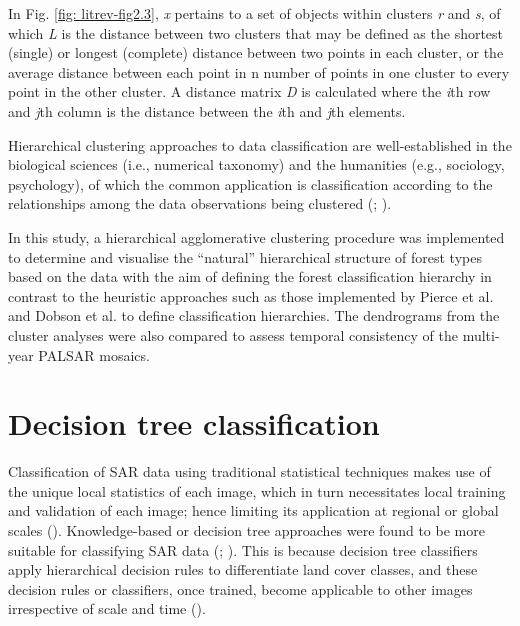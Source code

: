 In Fig. \ref{fig: litrev-fig2.3}, \textit{x} pertains to a set of objects within clusters \textit{r} and \textit{s}, of which \textit{L} is the distance between two clusters that may be defined as the shortest (single) or longest (complete) distance between two points in each cluster, or the average distance between each point in n number of points in one cluster to every point in the other cluster. A distance matrix \textit{D} is calculated where the \textit{i}th row and \textit{j}th column is the distance between the \textit{i}th and \textit{j}th elements.

Hierarchical clustering approaches to data classification are well-established in the biological sciences (i.e., numerical taxonomy) and the humanities (e.g., sociology, psychology), of which the common application is classification according to the relationships among the data observations being clustered (\cite{kaufman_introduction_1990}; \cite{podani_introduction_2000}).

In this study, a hierarchical agglomerative clustering procedure was implemented to determine and visualise the \enquote{natural} hierarchical structure of forest types based on the data with the aim of defining the forest classification hierarchy in contrast to the heuristic approaches such as those implemented by Pierce et al. \citeyearpar{pierce_knowledge-based_1994} and Dobson et al. \citeyearpar{dobson_knowledge-based_1996} to define classification hierarchies. The dendrograms from the cluster analyses were also compared to assess temporal consistency of the multi-year PALSAR mosaics.

\section{Decision tree classification}
\label{sec: litrev-decision-tree}

Classification of SAR data using traditional statistical techniques makes use of the unique local statistics of each image, which in turn necessitates local training and validation of each image; hence limiting its application at regional or global scales (\cite{dobson_knowledge-based_1996}). Knowledge-based or decision tree approaches were found to be more suitable for classifying SAR data (\cite{pierce_knowledge-based_1994}; \cite{dobson_knowledge-based_1996}). This is because decision tree classifiers apply hierarchical decision rules to differentiate land cover classes, and these decision rules or classifiers, once trained, become applicable to other images irrespective of scale and time (\cite{dobson_knowledge-based_1996}).

